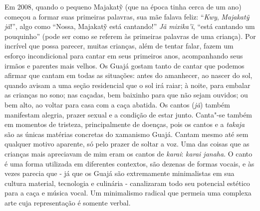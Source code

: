 Em 2008, quando o pequeno Majakatỹ (que na época tinha cerca de um ano)
começou a formar suas primeiras palavras, sua mãe falava feliz:
``\emph{Kwy}, \emph{Majakatỹ} \emph{jã}!'', algo como ``Nossa, Majakatỹ
está cantando!'' \emph{Jã} \emph{mixika'ĩ}, ``está cantando um pouquinho''
(pode ser como se referem às primeiras palavras de uma criança). Por
incrível que possa parecer, muitas crianças, além de tentar falar, fazem
um esforço incondicional para cantar em seus primeiros anos,
acompanhando seus irmãos e parentes mais velhos. Os Guajá gostam tanto
de cantar que podemos afirmar que cantam em todas as situações: antes do
amanhecer, ao nascer do sol, quando avisam a uma seção residencial que o
sol irá raiar; à noite, para embalar as crianças no sono; nas caçadas,
bem baixinho para que não sejam ouvidos; ou bem alto, ao voltar para
casa com a caça abatida. Os cantos (\emph{jã}) também manifestam
alegria, prazer sexual e a condição de estar junto. Canta"-se também em
momentos de tristeza, principalmente de doenças, pois os cantos e a
\emph{takaja} são as únicas matérias concretas do xamanismo Guajá.
Cantam mesmo até sem qualquer motivo aparente, só pelo prazer de soltar
a voz. Uma das coisas que as crianças mais apreciavam de mim eram os
cantos de \emph{karai}: \emph{karai janaha}. O canto é uma forma
utilizada em diferentes contextos, são dezenas de formas vocais, e às
vezes parecia que - já que os Guajá são extremamente minimalistas em sua
cultura material, tecnologia e culinária - canalizaram todo seu
potencial estético para a caça e música vocal. Um minimalismo radical
que permeia uma complexa arte cuja representação é somente verbal.

